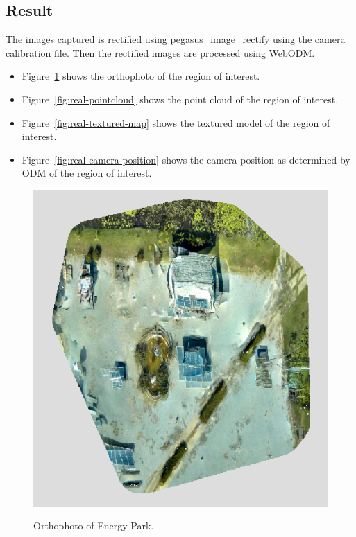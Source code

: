 \subsection{Result}
The images captured is rectified using pegasus\_image\_rectify using the camera calibration file. Then the rectified images are processed using WebODM.
\begin{itemize}
	\item Figure~\ref{fig:orthophoto-real} shows the orthophoto of the region of interest.
	\item Figure~\ref{fig:real-pointcloud} shows the point cloud of the region of interest.
	\item Figure~\ref{fig:real-textured-map} shows the textured model of the region of interest.
	\item Figure~\ref{fig:real-camera-position} shows the camera position as determined by ODM of the region of interest.
\end{itemize}

\begin{figure}
	\centering
	\caption[Orthophoto of Energy Park.]{\small Orthophoto of Energy Park.} 
	\includegraphics[width=5in]{figures/experiment/orthophoto-real}
	\label{fig:orthophoto-real}
\end{figure}

